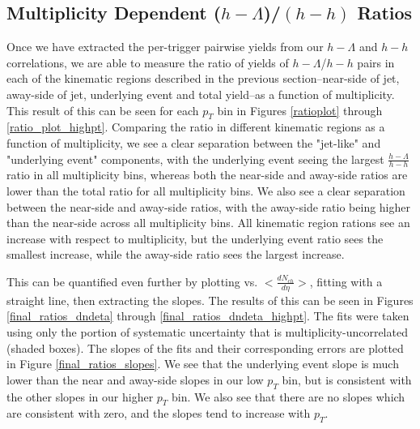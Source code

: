 \documentclass[ALICE,manyauthors]{ALICE_analysis_notes}
\begin{document}
\clearpage 


\subsection{Multiplicity Dependent ($h-\Lambda$)/$(h-h)$ Ratios}

Once we have extracted the per-trigger pairwise yields from our $h-\Lambda$ and $h-h$ correlations, we are able to measure the ratio of yields of $h-\Lambda$/$h-h$ pairs in each of the kinematic regions described in the previous section--near-side of jet, away-side of jet, underlying event and total yield--as a function of multiplicity. This result of this can be seen for each $p_{T}$ bin in Figures \ref{ratioplot} through \ref{ratio_plot_highpt}. Comparing the ratio in different kinematic regions as a function of multiplicity, we see a clear separation between the "jet-like" and "underlying event" components, with the underlying event seeing the largest $\frac{h-\Lambda}{h-h}$ ratio in all multiplicity bins, whereas both the near-side and away-side ratios are lower than the total ratio for all multiplicity bins. We also see a clear separation between the near-side and away-side ratios, with the away-side ratio being higher than the near-side across all multiplicity bins. All kinematic region rations see an increase with respect to multiplicity, but the underlying event ratio sees the smallest increase, while the away-side ratio sees the largest increase.

This can be quantified even further by plotting vs. $<\frac{dN_{ch}}{d\eta}>$, fitting with a straight line, then extracting the slopes. The results of this can be seen in Figures \ref{final_ratios_dndeta} through \ref{final_ratios_dndeta_highpt}. The fits were taken using only the portion of systematic uncertainty that is multiplicity-uncorrelated (shaded boxes). The slopes of the fits and their corresponding errors are plotted in Figure \ref{final_ratios_slopes}. We see that the underlying event slope is much lower than the near and away-side slopes in our low $p_{T}$ bin, but is consistent with the other slopes in our higher $p_{T}$ bin. We also see that there are no slopes which are consistent with zero, and the slopes tend to increase with $p_{T}$.

\clearpage
\end{document}
